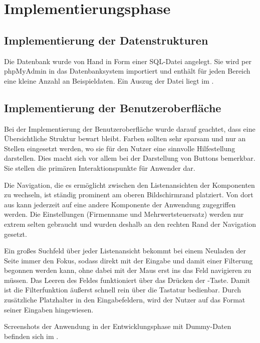 \section{Implementierungsphase} 
\label{sec:Implementierungsphase}

\subsection{Implementierung der Datenstrukturen}
\label{sec:ImplementierungDatenstrukturen}
Die Datenbank wurde von Hand in Form einer \acs{SQL}-Datei angelegt. Sie wird
per phpMyAdmin in das Datenbanksystem importiert und enthält für jeden Bereich
eine kleine Anzahl an Beispieldaten. Ein Auszug der Datei liegt im
.


\subsection{Implementierung der Benutzeroberfläche}
\label{sec:ImplementierungBenutzeroberflaeche}
Bei der Implementierung der Benutzeroberfläche wurde darauf geachtet, dass eine
Übersichtliche Struktur bewart bleibt. Farben sollten sehr sparsam und nur an
Stellen eingesetzt werden, wo sie für den Nutzer eine sinnvolle Hilfestellung
darstellen. Dies macht sich vor allem bei der Darstellung von Buttons
bemerkbar. Sie stellen die primären Interaktionspunkte für Anwender dar.

Die Navigation, die es ermöglicht zwischen den Listenansichten der Komponenten
zu wechseln, ist ständig prominent am oberen Bildschirmrand platziert. Von dort
aus kann jederzeit auf eine andere Komponente der Anwendung zugegriffen werden.
Die Einstellungen (Firmenname und Mehrwertsteuersatz) werden nur extrem selten
gebraucht und wurden deshalb an den rechten Rand der Navigation gesetzt.

Ein großes Suchfeld über jeder Listenansicht bekommt bei einem Neuladen der
Seite immer den Fokus, sodass direkt mit der Eingabe und damit einer Filterung
begonnen werden kann, ohne dabei mit der Maus erst ins das Feld navigieren zu
müssen. Das Leeren des Feldes funktioniert über das Drücken der
-Taste. Damit ist die Filterfunktion äußerst schnell rein über die
Tastatur bedienbar. Durch zusätzliche Platzhalter in den Eingabefeldern, wird
der Nutzer auf das Format seiner Eingaben hingewiesen.

Screenshots der Anwendung in der Entwicklungsphase mit Dummy-Daten befinden sich
im .



